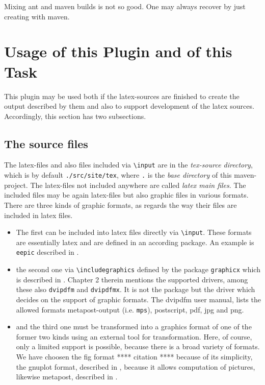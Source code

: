 \documentclass[12pt]{article}
\begin{document}
Mixing ant and maven builds is not so good. 
One may always recover by just creating with maven. 



\section{Usage of this Plugin and of this Task}\label{sec:usage}

This plugin may be used both if the latex-sources are finished 
to create the output described by them 
and also to support development of the latex sources. 
Accordingly, this section has two subsections. 

\subsection{The source files}\label{subsec:sources}

The latex-files and also files included via {\tt\textbackslash input} 
are in the {\em tex-source directory}, 
which is by default {\tt./src/site/tex}, 
where {\tt.} is the {\em base directory} of this maven-project. 
The latex-files not included anywhere are called {\em latex main files}. 
The included files may be again latex-files but also graphic files 
in various formats. 
There are three kinds of graphic formats, 
as regards the way their files are included in latex files. 
%
\begin{itemize}
\item
The first can be included into latex files directly 
via {\tt\textbackslash input}. 
These formats are essentially latex and are defined in an according package. 
An example is {\tt eepic} described in \cite{EEpic}. 
\item
the second one via {\tt\textbackslash includegraphics} 
defined by the package {\tt graphicx} 
which is described in \cite{GraX}. 
Chapter 2 therein mentions the supported drivers, 
among these also {\tt dvipdfm} and {\tt dvipdfmx}. 
It is not the package but the driver 
which decides on the support of graphic formats. 
The dvipdfm user manual, \cite{DviPdfMx} lists the allowed formats 
metapost-output (i.e. {\tt mps}), postscript, pdf, jpg and png. 
\item
and the third one must be transformed into a graphics format 
of one of the former two kinds using an external tool for transformation. 
Here, of course, only a limited support is possible, 
because there is a broad variety of formats. 
We have choosen the fig format **** citation **** because of its simplicity, 
the gnuplot format, described in \cite{GnuPlot}, 
because it allows computation of pictures, 
likewise metapost, described in \cite{MPost}. 
\end{itemize}
\end{document}
